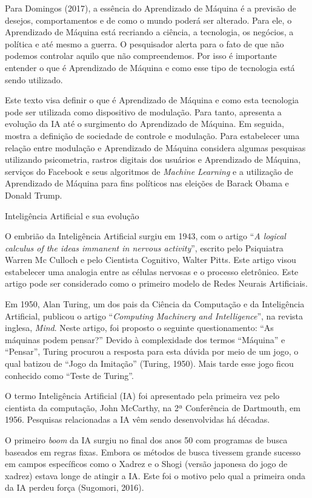 Para Domingos (2017), a essência do Aprendizado de Máquina é a previsão
de desejos, comportamentos e de como o mundo poderá ser alterado. Para
ele, o Aprendizado de Máquina está recriando a ciência, a tecnologia, os
negócios, a política e até mesmo a guerra. O pesquisador alerta para o
fato de que não podemos controlar aquilo que não compreendemos. Por isso
é importante entender o que é Aprendizado de Máquina e como esse tipo de
tecnologia está sendo utilizado.

Este texto visa definir o que é Aprendizado de Máquina e como esta
tecnologia pode ser utilizada como dispositivo de modulação. Para tanto,
apresenta a evolução da IA até o surgimento do Aprendizado de Máquina.
Em seguida, mostra a definição de sociedade de controle e modulação.
Para estabelecer uma relação entre modulação e Aprendizado de Máquina
considera algumas pesquisas utilizando psicometria, rastros digitais dos
usuários e Aprendizado de Máquina, serviços do Facebook e seus
algoritmos de \emph{Machine Learning} e a utilização de Aprendizado de
Máquina para fins políticos nas eleições de Barack Obama e Donald Trump.

\protect\hypertarget{_Toc520800099}{}{}Inteligência Artificial e sua
evolução

O embrião da Inteligência Artificial surgiu em 1943, com o artigo
``\emph{A logical calculus of the ideas immanent in nervous activity}'',
escrito pelo Psiquiatra Warren Mc Culloch e pelo Cientista Cognitivo,
Walter Pitts. Este artigo visou estabelecer uma analogia entre as
células nervosas e o processo eletrônico. Este artigo pode ser
considerado como o primeiro modelo de Redes Neurais Artificiais.

Em 1950, Alan Turing, um dos pais da Ciência da Computação e da
Inteligência Artificial, publicou o artigo ``\emph{Computing Machinery
and Intelligence}'', na revista inglesa, \emph{Mind}. Neste artigo, foi
proposto o seguinte questionamento: ``As máquinas podem pensar?'' Devido
à complexidade dos termos ``Máquina'' e ``Pensar'', Turing procurou a
resposta para esta dúvida por meio de um jogo, o qual batizou de ``Jogo
da Imitação'' (Turing, 1950). Mais tarde esse jogo ficou conhecido como
``Teste de Turing''.

O termo Inteligência Artificial (IA) foi apresentado pela primeira vez
pelo cientista da computação, John McCarthy, na 2ª Conferência de
Dartmouth, em 1956. Pesquisas relacionadas a IA vêm sendo desenvolvidas
há décadas.

O primeiro \emph{boom} da IA surgiu no final dos anos 50 com programas
de busca baseados em regras fixas. Embora os métodos de busca tivessem
grande sucesso em campos específicos como o Xadrez e o Shogi (versão
japonesa do jogo de xadrez) estava longe de atingir a IA. Este foi o
motivo pelo qual a primeira onda da IA perdeu força (Sugomori, 2016).

